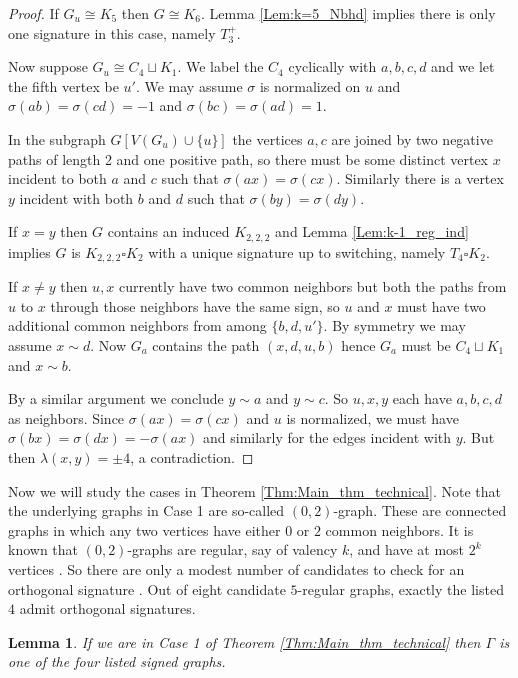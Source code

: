 \documentclass[11pt]{article}
\theoremstyle{plain}
\newtheorem{lemma}[theorem]{Lemma}
\theoremstyle{definition}
\begin{document}
\begin{proof}
    If $G_u\cong K_5$ then $G\cong K_6$. Lemma \ref{Lem:k=5_Nbhd} implies there is only one signature in this case, namely $T_3^+$.

    Now suppose $G_u\cong C_4\sqcup K_1$. We label the $C_4$ cyclically with $a,b,c,d$ and we let the fifth vertex be $u'$. We may assume $\sigma$ is normalized on $u$ and $\sigma(ab)=\sigma(cd)=-1$ and $\sigma(bc)=\sigma(ad)=1$.

    In the subgraph $G[V(G_u)\cup \{u\}]$ the vertices $a,c$ are joined by two negative paths of length 2 and one positive path, so there must be some distinct vertex $x$ incident to both $a$ and $c$ such that $\sigma(ax)=\sigma(cx)$. Similarly there is a vertex $y$ incident with both $b$ and $d$ such that $\sigma(by)=\sigma(dy)$. 

    If $x=y$ then $G$ contains an induced $K_{2,2,2}$ and Lemma \ref{Lem:k-1_reg_ind} implies $G$ is $K_{2,2,2}\square K_2$ with a unique signature up to switching, namely $T_4\square K_2$. 

    If $x\neq y$ then $u,x$ currently have two common neighbors but both the paths from $u$ to $x$ through those neighbors have the same sign, so $u$ and $x$ must have two additional common neighbors from among $\{b,d,u'\}.$ By symmetry we may assume $x\sim d$. Now $G_a$ contains the path $(x,d,u,b)$ hence $G_a$ must be $C_4\sqcup K_1$ and $x\sim b$. 

    By a similar argument we conclude $y\sim a$ and $y\sim c$. So $u,x,y$ each have $a,b,c,d$ as neighbors. Since $\sigma(ax)=\sigma(cx)$ and $u$ is normalized, we must have $\sigma(bx)=\sigma(dx)=-\sigma(ax)$ and similarly for the edges incident with $y$. But then $\lambda(x,y)=\pm 4$, a contradiction. 
\end{proof}


Now we will study the cases in Theorem \ref{Thm:Main_thm_technical}. Note that the underlying graphs in Case 1 are  so-called  $(0,2)$-graph. These are connected graphs in which any two vertices have either $0$ or $2$ common neighbors.
It is known that
 $(0,2)$-graphs are regular, say of valency $k$, and have at most $2^k$ vertices \cite{Mu}. So there are only a modest number of candidates to check for an orthogonal signature \cite{Br,BrCh}. 
 Out of eight candidate $5$-regular graphs, exactly the listed $4$ admit orthogonal signatures. 
 
\begin{lemma} \label{Lem:MT_02_graph}
    If we are in Case 1 of Theorem \ref{Thm:Main_thm_technical} then $\Gamma$ is one of the four listed signed graphs. 
\end{lemma}
\end{document}
